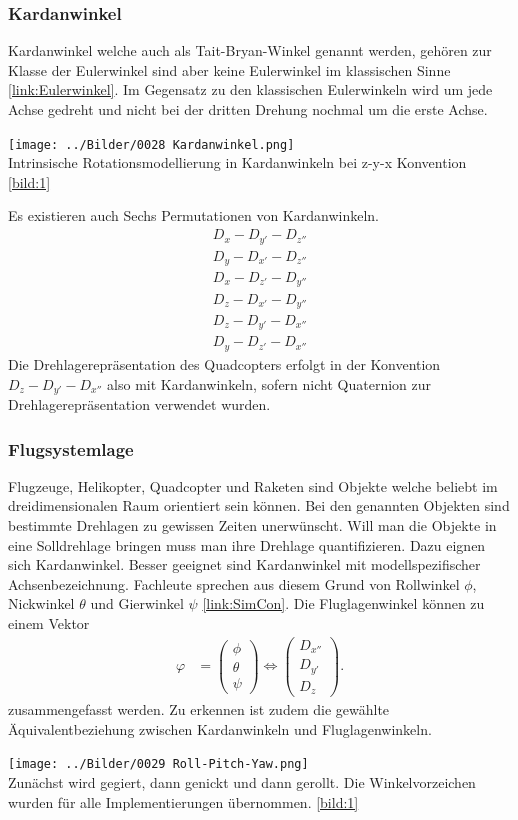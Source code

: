 \subsubsection{Kardanwinkel}
Kardanwinkel welche auch als Tait-Bryan-Winkel genannt werden, gehören zur Klasse der Eulerwinkel sind aber keine Eulerwinkel im klassischen Sinne \ref{link:Eulerwinkel}. Im Gegensatz zu den klassischen Eulerwinkeln wird um jede Achse gedreht und nicht bei der dritten Drehung nochmal um die erste Achse.
\begin{center}
	\texttt{[image: ../Bilder/0028 Kardanwinkel.png]}{\\Intrinsische Rotationsmodellierung in Kardanwinkeln bei z-y-x Konvention \ref{bild:1}}
\end{center}
Es existieren auch Sechs Permutationen von Kardanwinkeln. 
\begin{align}
	D_x-D_{y'}-D_{z''}\\
	D_y-D_{x'}-D_{z''}\\
	D_x-D_{z'}-D_{y''}\\
	D_z-D_{x'}-D_{y''}\\
	D_z-D_{y'}-D_{x''}\\
	D_y-D_{z'}-D_{x''}
\end{align}
Die Drehlagerepräsentation des Quadcopters erfolgt in der Konvention $D_z-D_{y'}-D_{x''}$ also mit Kardanwinkeln, sofern nicht Quaternion zur Drehlagerepräsentation verwendet wurden.

\subsubsection{Flugsystemlage}
Flugzeuge, Helikopter, Quadcopter und Raketen sind Objekte welche beliebt im dreidimensionalen Raum orientiert sein können. Bei den genannten Objekten sind bestimmte Drehlagen zu gewissen Zeiten unerwünscht. Will man die Objekte in eine Solldrehlage bringen muss man ihre Drehlage quantifizieren. Dazu eignen sich Kardanwinkel. Besser geeignet sind Kardanwinkel mit modellspezifischer Achsenbezeichnung. Fachleute sprechen aus diesem Grund von Rollwinkel $\phi$, Nickwinkel $\theta$ und Gierwinkel $\psi$ \ref{link:SimCon}.
Die Fluglagenwinkel können zu einem Vektor
\begin{align}
	\varphi &= \begin{pmatrix}
		\phi\\
		\theta\\
		\psi
	\end{pmatrix}
	\Leftrightarrow 
	\begin{pmatrix}
		D_{x''}\\
		D_{y'}\\
		D_{z}
	\end{pmatrix}.
\end{align}
zusammengefasst werden. Zu erkennen ist zudem die gewählte Äquivalentbeziehung zwischen Kardanwinkeln und Fluglagenwinkeln.
\begin{center}
	\texttt{[image: ../Bilder/0029 Roll-Pitch-Yaw.png]}{\\Zunächst wird gegiert, dann genickt und dann gerollt. Die Winkelvorzeichen wurden für alle Implementierungen übernommen. \ref{bild:1}}
\end{center}

